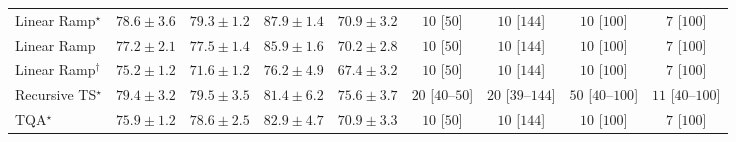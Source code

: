 \begin{tabular}{l|cccc|cccc|}
Linear Ramp$^\star$ & {\cellcolor[HTML]{88409C}} \color[HTML]{F1F1F1} $78.6\pm 3.6$ & {\cellcolor[HTML]{873A98}} \color[HTML]{F1F1F1} $79.3\pm 1.2$ & {\cellcolor[HTML]{6A0867}} \color[HTML]{F1F1F1} $87.9\pm 1.4$ & {\cellcolor[HTML]{8C71B4}} \color[HTML]{F1F1F1} $70.9\pm 3.2$ & {\cellcolor[HTML]{FFF7F3}} \color[HTML]{000000} $10$ [$50$] & {\cellcolor[HTML]{FFF7F3}} \color[HTML]{000000} $10$ [$144$] & {\cellcolor[HTML]{FFF7F3}} \color[HTML]{000000} $10$ [$100$] & {\cellcolor[HTML]{FFF7F3}} \color[HTML]{000000} $7$ [$100$] \\
Linear Ramp & {\cellcolor[HTML]{8949A1}} \color[HTML]{F1F1F1} $77.2\pm 2.1$ & {\cellcolor[HTML]{8947A0}} \color[HTML]{F1F1F1} $77.5\pm 1.4$ & {\cellcolor[HTML]{790D75}} \color[HTML]{F1F1F1} $85.9\pm 1.6$ & {\cellcolor[HTML]{8C76B7}} \color[HTML]{F1F1F1} $70.2\pm 2.8$ & {\cellcolor[HTML]{FFF7F3}} \color[HTML]{000000} $10$ [$50$] & {\cellcolor[HTML]{FFF7F3}} \color[HTML]{000000} $10$ [$144$] & {\cellcolor[HTML]{FFF7F3}} \color[HTML]{000000} $10$ [$100$] & {\cellcolor[HTML]{FFF7F3}} \color[HTML]{000000} $7$ [$100$] \\
Linear Ramp$^\dagger$ & {\cellcolor[HTML]{8A55A7}} \color[HTML]{F1F1F1} $75.2\pm 1.2$ & {\cellcolor[HTML]{8C6DB2}} \color[HTML]{F1F1F1} $71.6\pm 1.2$ & {\cellcolor[HTML]{894FA3}} \color[HTML]{F1F1F1} $76.2\pm 4.9$ & {\cellcolor[HTML]{8C88BF}} \color[HTML]{F1F1F1} $67.4\pm 3.2$ & {\cellcolor[HTML]{FFF7F3}} \color[HTML]{000000} $10$ [$50$] & {\cellcolor[HTML]{FFF7F3}} \color[HTML]{000000} $10$ [$144$] & {\cellcolor[HTML]{FFF7F3}} \color[HTML]{000000} $10$ [$100$] & {\cellcolor[HTML]{FFF7F3}} \color[HTML]{000000} $7$ [$100$] \\
Recursive TS$^\star$ & {\cellcolor[HTML]{873A98}} \color[HTML]{F1F1F1} $79.4\pm 3.2$ & {\cellcolor[HTML]{873897}} \color[HTML]{F1F1F1} $79.5\pm 3.5$ & {\cellcolor[HTML]{852A8E}} \color[HTML]{F1F1F1} $81.4\pm 6.2$ & {\cellcolor[HTML]{8A52A5}} \color[HTML]{F1F1F1} $75.6\pm 3.7$ & {\cellcolor[HTML]{FFF4F0}} \color[HTML]{000000} $20$ [$40$--$50$] & {\cellcolor[HTML]{FFF4F0}} \color[HTML]{000000} $20$ [$39$--$144$] & {\cellcolor[HTML]{FEEEEA}} \color[HTML]{000000} $50$ [$40$--$100$] & {\cellcolor[HTML]{FFF6F2}} \color[HTML]{000000} $11$ [$40$--$100$] \\
TQA$^\star$ & {\cellcolor[HTML]{8A51A5}} \color[HTML]{F1F1F1} $75.9\pm 1.2$ & {\cellcolor[HTML]{88409C}} \color[HTML]{F1F1F1} $78.6\pm 2.5$ & {\cellcolor[HTML]{831F86}} \color[HTML]{F1F1F1} $82.9\pm 4.7$ & {\cellcolor[HTML]{8C71B4}} \color[HTML]{F1F1F1} $70.9\pm 3.3$ & {\cellcolor[HTML]{FFF7F3}} \color[HTML]{000000} $10$ [$50$] & {\cellcolor[HTML]{FFF7F3}} \color[HTML]{000000} $10$ [$144$] & {\cellcolor[HTML]{FFF7F3}} \color[HTML]{000000} $10$ [$100$] & {\cellcolor[HTML]{FFF7F3}} \color[HTML]{000000} $7$ [$100$] \\

\end{tabular}
